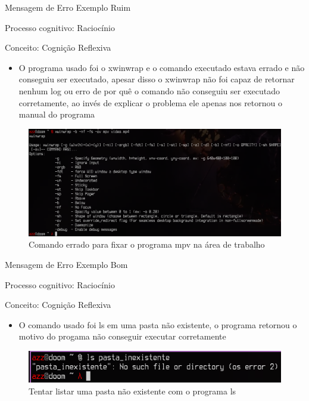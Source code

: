 \documentclass{beamer}
\begin{document}
\begin{frame}{Mensagem de Erro Exemplo Ruim}

Processo cognitivo: Raciocínio

Conceito: Cognição Reflexiva

\begin{itemize}
    \item O programa usado foi o xwinwrap e o comando executado estava errado e não conseguiu ser executado, apesar disso o xwinwrap não foi capaz de retornar nenhum log ou erro de por quê o comando não conseguiu ser executado corretamente, ao invés de explicar o problema ele apenas nos retornou o manual do programa
\end{itemize}
\begin{figure}
    \centering
    \includegraphics[scale=0.25]{images/xwinwrap-error.png}
    \caption{Comando errado para fixar o programa mpv na área de trabalho}
\end{figure}

\end{frame}

\begin{frame}{Mensagem de Erro Exemplo Bom}

Processo cognitivo: Raciocínio

Conceito: Cognição Reflexiva

\begin{itemize}
    \item O comando usado foi ls em uma pasta não existente, o programa retornou o motivo do progama não conseguir executar corretamente
\end{itemize}
\begin{figure}
    \centering
    \includegraphics[scale=0.6]{images/ls-error.png}
    \caption{Tentar listar uma pasta não existente com o programa ls}
\end{figure}

\end{frame}
\end{document}
